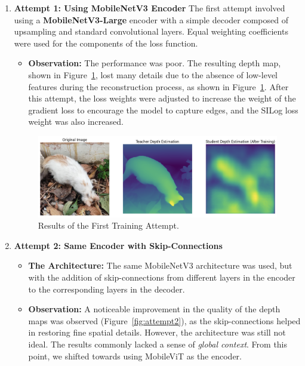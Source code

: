 \begin{enumerate}
    \item \textbf{Attempt 1: Using MobileNetV3 Encoder}
    The first attempt involved using a \textbf{MobileNetV3-Large} encoder with a simple decoder composed of upsampling and standard convolutional layers. Equal weighting coefficients were used for the components of the loss function.
    \begin{itemize}
        \item \textbf{Observation:} The performance was poor. The resulting depth map, shown in Figure~\ref{fig:attempt1}, lost many details due to the absence of low-level features during the reconstruction process, as shown in Figure~\ref{fig:attempt1}. After this attempt, the loss weights were adjusted to increase the weight of the gradient loss to encourage the model to capture edges, and the SILog loss weight was also increased.
    \end{itemize}

    \begin{figure}[htbp!]
        \centering
        \includegraphics[width=\textwidth]{images/training_attempt_1.png}
        \caption{Results of the First Training Attempt.}
        \label{fig:attempt1}
    \end{figure}
    
    \item \textbf{Attempt 2: Same Encoder with Skip-Connections}
    \begin{itemize}
        \item \textbf{The Architecture:} The same MobileNetV3 architecture was used, but with the addition of skip-connections from different layers in the encoder to the corresponding layers in the decoder.
        \item \textbf{Observation:} A noticeable improvement in the quality of the depth maps was observed (Figure~\ref{fig:attempt2}), as the skip-connections helped in restoring fine spatial details. However, the architecture was still not ideal. The results commonly lacked a sense of \textit{global context}. From this point, we shifted towards using MobileViT as the encoder.
    \end{itemize}


\end{enumerate}
